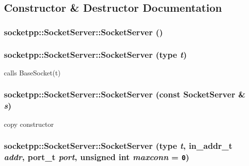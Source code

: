 \subsection{Constructor \& Destructor Documentation}
\hypertarget{classsocketpp_1_1SocketServer_7a6c01da97c291e40adfcd33a5548c1b}{
\subsubsection[{SocketServer}]{\setlength{\rightskip}{0pt plus 5cm}socketpp::SocketServer::SocketServer ()}}
\label{classsocketpp_1_1SocketServer_7a6c01da97c291e40adfcd33a5548c1b}


\hypertarget{classsocketpp_1_1SocketServer_3a6955b6d5617457cf31206ea9492786}{
\subsubsection[{SocketServer}]{\setlength{\rightskip}{0pt plus 5cm}socketpp::SocketServer::SocketServer ({\bf type} {\em t})}}
\label{classsocketpp_1_1SocketServer_3a6955b6d5617457cf31206ea9492786}


calls BaseSocket(t) 

\hypertarget{classsocketpp_1_1SocketServer_e83ff222d6d4dd600dc162926afdac0f}{
\subsubsection[{SocketServer}]{\setlength{\rightskip}{0pt plus 5cm}socketpp::SocketServer::SocketServer (const {\bf SocketServer} \& {\em s})}}
\label{classsocketpp_1_1SocketServer_e83ff222d6d4dd600dc162926afdac0f}


copy constructor 

\hypertarget{classsocketpp_1_1SocketServer_73c5125f9e5a6cf03dc15f6d4250e345}{
\subsubsection[{SocketServer}]{\setlength{\rightskip}{0pt plus 5cm}socketpp::SocketServer::SocketServer ({\bf type} {\em t}, \/  in\_\-addr\_\-t {\em addr}, \/  {\bf port\_\-t} {\em port}, \/  unsigned int {\em maxconn} = {\tt 0})}}
\label{classsocketpp_1_1SocketServer_73c5125f9e5a6cf03dc15f6d4250e345}


